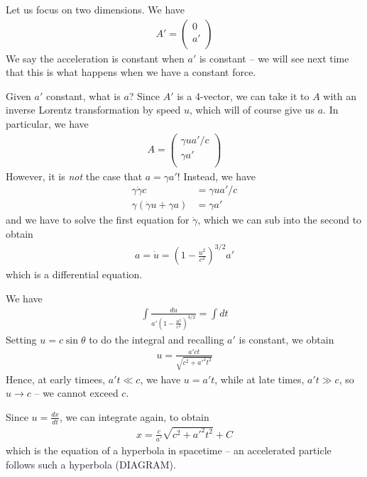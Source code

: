 \documentclass{../template/note}
\begin{document}
    Let us focus on two dimensions. We have
    \begin{align*}
        A' = \begin{pmatrix}
            0 \\
            a' \\
        \end{pmatrix}
    \end{align*}
    We say the acceleration is constant when $a'$ is constant -- we will see next time that this is what happens when we have a constant force.

    Given $a'$ constant, what is $a$? Since $A'$ is a 4-vector, we can take it to $A$ with an inverse Lorentz transformation by speed $u$, which will of course give us $a$. In particular, we have
    \begin{align*}
        A = \begin{pmatrix}
            \gamma ua'/c \\
            \gamma a' \\
        \end{pmatrix}
    \end{align*}
    However, it is \emph{not} the case that $a = \gamma a'$! Instead, we have
    \begin{align*}
        \gamma \dot \gamma c &= \gamma ua'/c \\
        \gamma(\dot \gamma u + \gamma a) &= \gamma a'
    \end{align*}
    and we have to solve the first equation for $\dot \gamma$, which we can sub into the second to obtain
    \begin{align*}
        a = \dot u = \left(1-\frac{u^2}{c^2}\right)^{3/2}a'
    \end{align*}
    which is a differential equation.   


    We have
    \begin{align*}
        \int \frac{du}{a' \left(1-\frac{u^2}{c^2}\right)^{3/2}} = \int dt
    \end{align*}
    Setting \(u = c \sin \theta\) to do the integral and recalling \(a'\) is constant, we obtain
    \begin{align*}
        u = \frac{a'ct}{\sqrt{c^2+a'^2t^2}}
    \end{align*}
    Hence, at early timees, \(a't \ll c\), we have \(u = a't\), while at late times, \(a't \gg c\), so \(u \to c\) -- we cannot exceed \(c\).

    Since \(u = \frac{dx}{dt}\), we can integrate again, to obtain
    \begin{align*}
        x = \frac c {a'} \sqrt{c^2+a'^2t^2} + C
    \end{align*}
    which is the equation of a hyperbola in spacetime -- an accelerated particle follows such a hyperbola (DIAGRAM).
\end{document}
